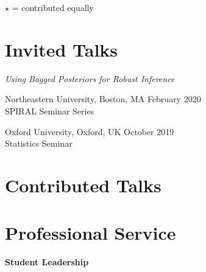 \documentclass[margin,line]{res}
\newenvironment{talkgroup}{\setlength{\parskip}{3pt}\everypar{\hangafter=1\hangindent=1em\relax}\par}{\par\everypar{\hangafter=0\relax}}
\begin{document}
\begin{resume}
%
%


$\star$ = contributed equally



\section{\sc Invited Talks}

\emph{Using Bagged Posteriors for Robust Inference}

\begin{talkgroup}
Northeastern University, Boston, MA \hfill February 2020 \\
SPIRAL Seminar Series

Oxford University, Oxford, UK \hfill October 2019 \\
Statistics Seminar

\end{talkgroup}



\section{\sc Contributed Talks}

%
%
%



\section{\sc Professional Service}

\textbf{Student Leadership}


\end{resume}
\end{document}

